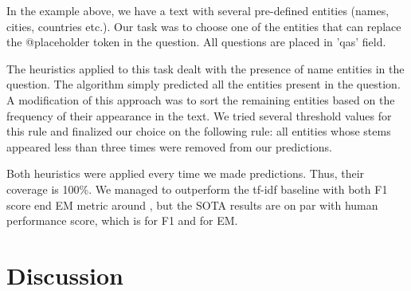 \documentclass[11pt]{article}
\begin{document}
In the example above, we have a text with several pre-defined entities (names, cities, countries etc.). Our task was to choose one of the entities that can replace the @placeholder token in the question. All questions are placed in 'qas' field.  

The heuristics applied to this task dealt with the presence of name entities in the question. The algorithm simply predicted all the entities present in the question. A modification of this approach was to sort the remaining entities based on the frequency of their appearance in the text. We tried several threshold values for this rule and finalized our choice on the following rule: all entities whose stems appeared less than three times were removed from our predictions. 

Both heuristics were applied every time we made predictions. Thus, their coverage is 100\%. We managed to outperform the tf-idf baseline with both F1 score end EM metric around , but the SOTA results are on par with human performance score, which is  for F1 and  for EM. 

\section{Discussion}
\label{discussion}
\end{document}
